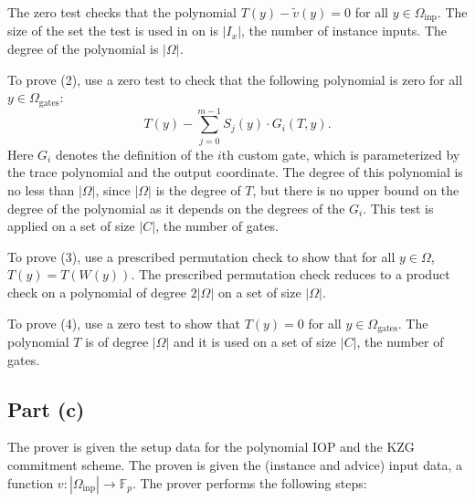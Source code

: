 \documentclass[11pt]{article}
\begin{document}
The zero test checks that the polynomial $T(y) - \widetilde{v}(y) = 0$ for all $y \in \Omega_{\text{inp}}$.
The size of the set the test is used in on is $|I_x|$, the number of instance inputs.
The degree of the polynomial is $|\Omega|$.

To prove (2), use a zero test to check that the following polynomial is zero for all $y \in \Omega_{\text{gates}}$:
\begin{equation}
	T(y) - \sum_{j=0}^{m-1} S_j(y) \cdot G_i(T, y).
\end{equation}
Here $G_i$ denotes the definition of the $i$th custom gate, which is parameterized by the trace polynomial and
the output coordinate. The degree of this polynomial is no less than $|\Omega|$, since $|\Omega|$ is the degree
of $T$, but there is no upper bound on the degree of the polynomial as it depends on the degrees of the $G_i$.
This test is applied on a set of size $|C|$, the number of gates.

To prove (3), use a prescribed permutation check to show that for all $y \in \Omega$, $T(y) = T(W(y))$.
The prescribed permutation check reduces to a product check on a polynomial of degree $2|\Omega|$
on a set of size $|\Omega|$.

To prove (4), use a zero test to show that $T(y) = 0$ for all $y \in \Omega_{\text{gates}}$. 
The polynomial $T$ is of degree $|\Omega|$ and it is used on a set of size $|C|$, the number of gates.

\subsection{Part (c)}

The prover is given the setup data for the polynomial IOP and the KZG commitment scheme.
The proven is given the (instance and advice) input data, a function
$v : |\Omega_{\text{inp}}| \to \mathbb{F}_p$.
The prover performs the following steps:
\end{document}
